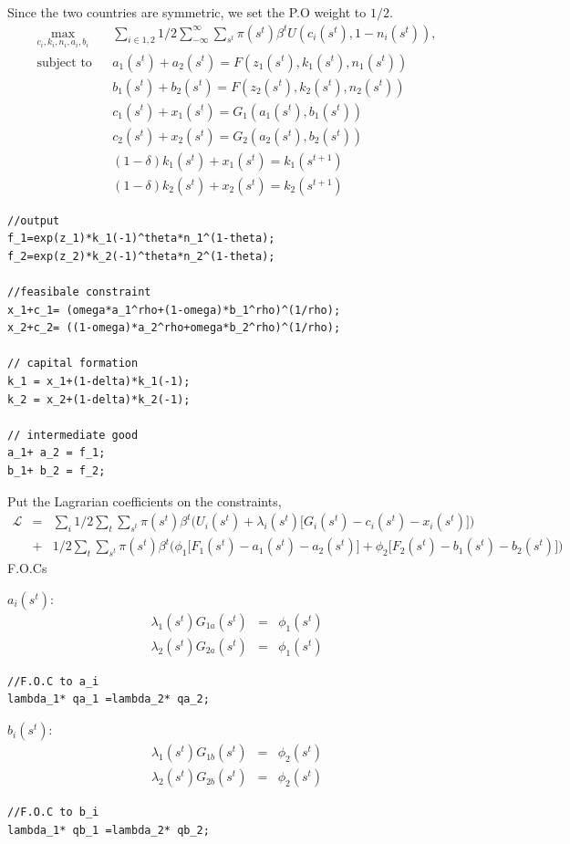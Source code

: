 \documentclass[11pt,a4paper]{article}
\begin{document}
Since the two countries are symmetric, we set the P.O weight to $1/2$.
\begin{eqnarray}
  \underset{c_i,k_i,n_i,a_i,b_i}{\text{max}}
 & & \sum_{i \in {1,2}} 1/2\sum^\infty_{-\infty}\sum_{s^t}\pi(s^t)\beta^t U(c_i(s^t),1-n_i(s^t)), \\
  \text{subject to}
 & & a_1(s^t)+a_2(s^t)=F(z_1(s^t),k_1(s^t),n_1(s^t))  \\
 & & b_1(s^t)+b_2(s^t)=F(z_2(s^t),k_2(s^t),n_2(s^t))\\
 & & c_1(s^t)+x_1(s^t)= G_1(a_1(s^t),b_1(s^t))\\
 & & c_2(s^t)+x_2(s^t)=G_2(a_2(s^t),b_2(s^t))\\
 & & (1-\delta)k_1(s^t)+x_1(s^t) =k_1(s^{t+1})\\
 & & (1-\delta)k_2(s^t)+x_2(s^t) =k_2(s^{t+1})
\end{eqnarray}
\begin{lstlisting}
//output
f_1=exp(z_1)*k_1(-1)^theta*n_1^(1-theta);
f_2=exp(z_2)*k_2(-1)^theta*n_2^(1-theta);

//feasibale constraint
x_1+c_1= (omega*a_1^rho+(1-omega)*b_1^rho)^(1/rho);
x_2+c_2= ((1-omega)*a_2^rho+omega*b_2^rho)^(1/rho);

// capital formation
k_1 = x_1+(1-delta)*k_1(-1);
k_2 = x_2+(1-delta)*k_2(-1);

// intermediate good
a_1+ a_2 = f_1;
b_1+ b_2 = f_2;
\end{lstlisting}
Put the Lagrarian coefficients on the constraints, 
\begin{eqnarray}
\mathcal{L} &=& \sum_i1/2\sum_t\sum_{s^t}\pi(s^t)\beta^t \bigg(U_i(s^t)+\lambda_i(s^t)\big[ G_i(s^t)-c_i(s^t)-x_i(s^t)\big]\bigg) \\
&+&1/2\sum_t\sum_{s^t}\pi(s^t)\beta^t \bigg(\phi_1 \big[ F_1(s^t)-a_1(s^t)-a_2(s^t)\big]+\phi_2 \big[ F_2(s^t)-b_1(s^t)-b_2(s^t)\big]\bigg)
\end{eqnarray}
F.O.Cs 

$a_i(s^t)$:
\begin{eqnarray}
\lambda_1(s^t) G_{1a}(s^t) &=&\phi_1(s^t)\\
\lambda_2(s^t) G_{2a}(s^t) &=&\phi_1(s^t)
\end{eqnarray}
\begin{lstlisting}
//F.O.C to a_i
lambda_1* qa_1 =lambda_2* qa_2;
\end{lstlisting}

$b_i(s^t)$:
\begin{eqnarray}
\lambda_1(s^t) G_{1b}(s^t) &=&\phi_2(s^t)\\
\lambda_2(s^t) G_{2b}(s^t) &=&\phi_2(s^t)
\end{eqnarray}
\begin{lstlisting}
//F.O.C to b_i
lambda_1* qb_1 =lambda_2* qb_2;
\end{lstlisting}
\end{document}
